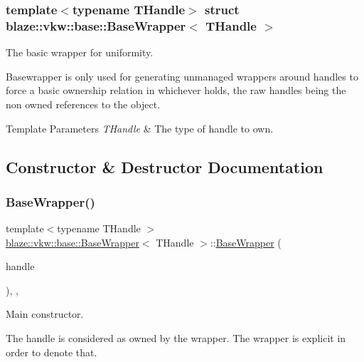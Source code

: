 \subsubsection*{template$<$typename T\+Handle$>$\newline
struct blaze\+::vkw\+::base\+::\+Base\+Wrapper$<$ T\+Handle $>$}

The basic wrapper for uniformity. 

Basewrapper is only used for generating unmanaged wrappers around handles to force a basic ownership relation in whichever holds, the raw handles being the non owned references to the object.


\begin{DoxyTemplParams}{Template Parameters}
{\em T\+Handle} & The type of handle to own. \\
\hline
\end{DoxyTemplParams}


\subsection{Constructor \& Destructor Documentation}
\mbox{\label{structblaze_1_1vkw_1_1base_1_1BaseWrapper_a5569991b2ff88d2a758dcc7d93141c96}} 
\subsubsection{\texorpdfstring{Base\+Wrapper()}{BaseWrapper()}}
{\footnotesize\ttfamily template$<$typename T\+Handle $>$ \\
\hyperlink{structblaze_1_1vkw_1_1base_1_1BaseWrapper}{blaze\+::vkw\+::base\+::\+Base\+Wrapper}$<$ T\+Handle $>$\+::\hyperlink{structblaze_1_1vkw_1_1base_1_1BaseWrapper}{Base\+Wrapper} (\begin{DoxyParamCaption}\item[{T\+Handle}]{handle }\end{DoxyParamCaption})\hspace{0.3cm}{\ttfamily [inline]}, {\ttfamily [explicit]}, {\ttfamily [noexcept]}}



Main constructor. 

The handle is considered as owned by the wrapper. The wrapper is explicit in order to denote that.


